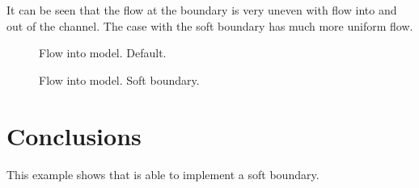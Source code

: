 It can be seen that the flow at the boundary is very uneven with flow into and
out of the channel.
The case with the soft boundary has much more uniform flow.


\begin{figure}[H]
\centering
{}
\caption{Flow into model. Default.}
\label{t2d:def:fig:inflow}
\end{figure}

\begin{figure}[H]
\centering
{}
\caption{Flow into model. Soft boundary.}
\label{t2d:soft:fig:inflow}
\end{figure}

\section{Conclusions}

This example shows that  is able to implement a soft boundary.
